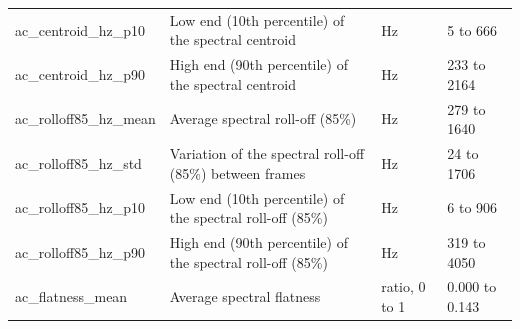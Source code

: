 \documentclass[11pt,a4paper]{article}
\begin{document}
\begin{center}
\begin{longtable}{>{\raggedright\arraybackslash}p{3.70cm}>{\raggedright\arraybackslash}p{6.65cm}>{\raggedright\arraybackslash}p{1.90cm}>{\raggedright\arraybackslash}p{2.56cm}}
\hspace{0pt}ac\_\allowbreak{}centroid\_\allowbreak{}hz\_\allowbreak{}p10 & \hspace{0pt}Low end (10th percentile) of the spectral centroid & \hspace{0pt}Hz & \hspace{0pt}5 to 666\\
\hspace{0pt}ac\_\allowbreak{}centroid\_\allowbreak{}hz\_\allowbreak{}p90 & \hspace{0pt}High end (90th percentile) of the spectral centroid & \hspace{0pt}Hz & \hspace{0pt}233 to 2164\\
\hspace{0pt}ac\_\allowbreak{}rolloff85\_\allowbreak{}hz\_\allowbreak{}mean & \hspace{0pt}Average spectral roll-off (85\%) & \hspace{0pt}Hz & \hspace{0pt}279 to 1640\\
\hspace{0pt}ac\_\allowbreak{}rolloff85\_\allowbreak{}hz\_\allowbreak{}std & \hspace{0pt}Variation of the spectral roll-off (85\%) between frames & \hspace{0pt}Hz & \hspace{0pt}24 to 1706\\
\hspace{0pt}ac\_\allowbreak{}rolloff85\_\allowbreak{}hz\_\allowbreak{}p10 & \hspace{0pt}Low end (10th percentile) of the spectral roll-off (85\%) & \hspace{0pt}Hz & \hspace{0pt}6 to 906\\
\hspace{0pt}ac\_\allowbreak{}rolloff85\_\allowbreak{}hz\_\allowbreak{}p90 & \hspace{0pt}High end (90th percentile) of the spectral roll-off (85\%) & \hspace{0pt}Hz & \hspace{0pt}319 to 4050\\
\hspace{0pt}ac\_\allowbreak{}flatness\_\allowbreak{}mean & \hspace{0pt}Average spectral flatness & \hspace{0pt}ratio, 0 to 1 & \hspace{0pt}0.000 to 0.143\\

\end{longtable}
\end{center}
\end{document}
